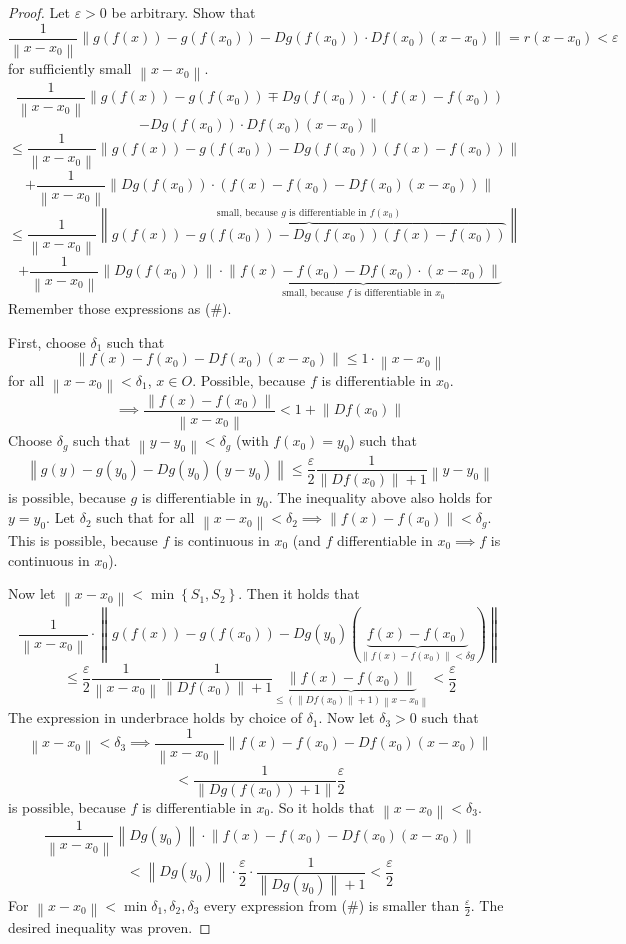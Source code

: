 \documentclass[a4paper,landscape,twocolumn]{article}
\theoremstyle{definition}
\newcommand\set[1]{\left\{#1\right\}}
\newcommand\norm[1]{\left\|#1\right\|}
\begin{document}
\begin{proof}
  Let $\varepsilon > 0$ be arbitrary.
  Show that
  \[ \frac{1}{\norm{x - x_0}} \norm{g(f(x)) - g(f(x_0)) - Dg(f(x_0)) \cdot Df(x_0) (x - x_0)} = r (x - x_0) < \varepsilon \]
  for sufficiently small $\norm{x - x_0}$.
  \[ \frac{1}{\norm{x - x_0}} \| g(f(x)) - g(f(x_0)) \mp Dg(f(x_0)) \cdot (f(x) - f(x_0)) \]\[ - Dg(f(x_0)) \cdot Df(x_0) (x - x_0)\| \]
  \[ \leq \frac{1}{\norm{x - x_0}} \norm{g(f(x)) - g(f(x_0)) - Dg(f(x_0)) (f(x) - f(x_0))} \]
  \[ + \frac{1}{\norm{x - x_0}} \norm{Dg(f(x_0)) \cdot \left(f(x) - f(x_0) - Df(x_0) (x - x_0)\right)} \]
  \[ \leq \frac{1}{\norm{x - x_0}} \norm{\overbrace{g(f(x)) - g(f(x_0)) - Dg(f(x_0)) (f(x) - f(x_0))}^{\text{small, because }g\text{ is differentiable in }f(x_0)}} \]
  \[ + \frac{1}{\norm{x - x_0}} \norm{Dg(f(x_0))} \cdot \underbrace{\norm{f(x) - f(x_0) - Df(x_0) \cdot (x - x_0)}}_{\text{small, because $f$ is differentiable in $x_0$}} \]
  Remember those expressions as (\#).

  First, choose $\delta_1$ such that
  \[ \norm{f(x) - f(x_0) - Df(x_0) (x - x_0)} \leq 1 \cdot \norm{x - x_0} \]
  for all $\norm{x - x_0} < \delta_1$, $x \in O$.
  Possible, because $f$ is differentiable in $x_0$.
  \[ \implies \frac{\norm{f(x) - f(x_0)}}{\norm{x - x_0}} < 1 + \norm{Df(x_0)} \]
  Choose $\delta_g$ such that $\norm{y - y_0} < \delta_g$ (with $f(x_0) = y_0$) such that
  \[ \norm{g(y) - g(y_0) - Dg(y_0) (y - y_0)} \leq \frac\varepsilon2 \frac{1}{\norm{Df(x_0)} + 1} \norm{y - y_0} \]
  is possible, because $g$ is differentiable in $y_0$.
  The inequality above also holds for $y = y_0$.
  Let $\delta_2$ such that for all $\norm{x - x_0} < \delta_2 \implies \norm{f(x) - f(x_0)} < \delta_g$.
  This is possible, because $f$ is continuous in $x_0$
  (and $f$ differentiable in $x_0 \implies f$ is continuous in $x_0$).

  Now let $\norm{x - x_0} < \min\set{S_1, S_2}$. Then it holds that
  \[ \frac{1}{\norm{x - x_0}} \cdot \norm{g(f(x)) - g(f(x_0)) - Dg(y_0)\left(\underbrace{f(x) - f(x_0)}_{\norm{f(x) - f(x_0)} < \delta g}\right)} \]
  \[ \leq \frac{\varepsilon}{2} \frac{1}{\norm{x - x_0}} \frac{1}{\norm{Df(x_0)} + 1} \underbrace{\norm{f(x) - f(x_0)}}_{\leq (\norm{Df(x_0)} + 1)\norm{x - x_0}} < \frac{\varepsilon}{2} \]
  The expression in underbrace holds by choice of $\delta_1$.
  Now let $\delta_3 > 0$ such that
  \[ \norm{x - x_0} < \delta_3
  \implies \frac{1}{\norm{x - x_0}} \norm{f(x) - f(x_0) - Df(x_0)(x - x_0)} \]
  \[ < \frac{1}{\norm{Dg(f(x_0)) + 1}} \frac{\varepsilon}{2} \]
  is possible, because $f$ is differentiable in $x_0$.
  So it holds that $\norm{x - x_0} < \delta_3$.
  \[ \frac{1}{\norm{x - x_0}} \norm{Dg(y_0)} \cdot \norm{f(x) - f(x_0) - Df(x_0)(x - x_0)} \]
  \[ < \norm{Dg(y_0)} \cdot \frac{\varepsilon}{2} \cdot \frac{1}{\norm{Dg(y_0)} + 1} < \frac{\varepsilon}{2} \]
  For $\norm{x - x_0} < \min{\delta_1, \delta_2, \delta_3}$ every expression from (\#)
  is smaller than $\frac\varepsilon2$. The desired inequality was proven.
\end{proof}
\end{document}
